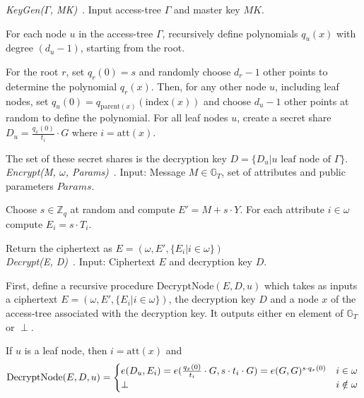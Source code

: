 \emph{KeyGen($\Gamma$, MK)}~\cite{goyal_attribute-based_2006}.
Input \gls{access-tree} $\Gamma$ and master key $MK$.

For each node $u$ in the \gls{access-tree} $\Gamma$, recursively define polynomials $q_u(x)$ with degree $(d_u - 1)$, starting from the root.

For the root $r$, set $q_r(0) = s$ and randomly choose $d_r -1$ other points to determine the polynomial $q_r(x)$.
Then, for any other node $u$, including leaf nodes, set $q_u(0) = q_{\text{parent}(x)}(\text{index}(x))$ and choose $d_u -1$ other points at random to define the polynomial. 
For all leaf nodes $u$, create a secret share $D_u = \frac{q_x(0)}{t_i} \cdot G$ where $i = \text{att}(x)$.

The set of these secret shares is the decryption key $D = \{D_u | u \text{ leaf node of } \Gamma\}$.\\

\emph{Encrypt(M, $\omega$, Params)}~\cite{goyal_attribute-based_2006}.
Input: Message $M \in \mathbb{G}_T$, set of \glspl{attribute} and public parameters $Params$. 

Choose $s \in \mathbb{Z}_q$ at random and compute $E' = M + s \cdot Y$.
For each attribute $i \in \omega$ compute $E_i = s \cdot T_i$.

Return the ciphertext as $E = (\omega, E', \{E_i | i \in \omega\})$
\\

\emph{Decrypt(E, D)}~\cite{goyal_attribute-based_2006}.
Input: Ciphertext $E$ and decryption key $D$.

First, define a recursive procedure $\text{DecryptNode}(E, D, u)$ which takes as inputs a ciphertext $E = (\omega, E', \{E_i | i \in \omega\})$, the decryption key $D$ and a node $x$ of the \gls{access-tree} associated with the decryption key.
It outputs either en element of $\mathbb{G}_T$ or $\perp$.

If $u$ is a leaf node, then $i = \text{att}(x)$ and 
\begin{equation}
    \text{DecryptNode}(E, D, u) = \begin{cases}
        e(D_u, E_i) = e(\frac{q_x(0)}{t_i} \cdot G, s \cdot t_i \cdot G) = e(G, G)^{s\cdot q_x(0)} & i \in \omega\\
        \perp & i \notin \omega
    \end{cases}\\
\end{equation}

